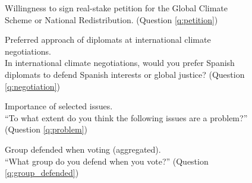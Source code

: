 \documentclass[12pt,english]{article}
\begin{document}
\begin{figure}[h!]
    \caption[Willingness to sign a real-stake petition]{Willingness to sign real-stake petition for the Global Climate Scheme or National Redistribution. (Question \ref{q:petition})}\label{fig:petition}
\end{figure}

\begin{figure}[h!]
    \caption[Preferred approach for international climate negotiations]{Preferred approach of diplomats at international climate negotiations. \\ In international climate negotiations, would you prefer Spanish diplomats to defend Spanish interests or global justice? (Question \ref{q:negotiation})}\label{fig:negotiation}
\end{figure}

\begin{figure}[h!]
    \caption[Importance of selected issues]{Importance of selected issues.\\ ``To what extent do you think the following issues are a problem?'' (Question \ref{q:problem})}\label{fig:problem}
\end{figure}

\begin{figure}[h!]
    \caption[Group defended when voting (aggregated)]{Group defended when voting (aggregated). \\ ``What group do you defend when you vote?'' (Question \ref{q:group_defended})}\label{fig:group_defended}
\end{figure}
\end{document}
